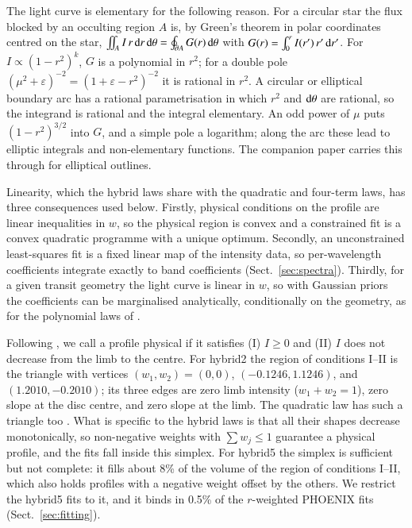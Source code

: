 \documentclass{aa}
\begin{document}
The light curve is elementary for the following reason. For a circular
star the flux blocked by an occulting region $A$ is, by Green's theorem in
polar coordinates centred on the star,
$\iint_A I\,r\,{\rm d}r\,{\rm d}\theta=\oint_{\partial A}G(r)\,{\rm d}\theta$
with $G(r)=\int_0^rI(r')\,r'\,{\rm d}r'$. For $I\propto(1-r^2)^k$, $G$ is a
polynomial in $r^2$; for a double pole $(\mu^2+\varepsilon)^{-2}=
(1+\varepsilon-r^2)^{-2}$ it is rational in $r^2$. A circular or elliptical
boundary arc has a rational parametrisation in which $r^2$ and ${\rm
d}\theta$ are rational, so the integrand is rational and the integral
elementary. An odd power of $\mu$ puts $(1-r^2)^{3/2}$ into $G$, and a simple
pole a logarithm; along the arc these lead to elliptic integrals and
non-elementary functions. The companion paper \citep{squishier} carries this
through for elliptical outlines.

Linearity, which the hybrid laws share with the quadratic and four-term
laws, has three consequences used below. Firstly, physical conditions on the
profile are linear inequalities in $w$, so the physical region is convex and a
constrained fit is a convex quadratic programme with a unique optimum.
Secondly, an unconstrained least-squares fit is a fixed linear map of the
intensity data, so per-wavelength coefficients integrate exactly to band
coefficients (Sect.~\ref{sec:spectra}). Thirdly, for a given transit geometry
the light curve is linear in $w$, so with Gaussian priors the coefficients can
be marginalised analytically, conditionally on the geometry, as for the
polynomial laws of \citet{agol2020}.

Following \citet{kipping2013}, we call a profile physical if it satisfies
(I) $I\ge0$ and (II) $I$ does not decrease from the limb to the centre. For
hybrid2 the region of conditions I--II is the triangle with vertices
$(w_1,w_2)=(0,0)$, $(-0.1246,1.1246)$, and $(1.2010,-0.2010)$; its three edges
are zero limb intensity ($w_1+w_2=1$), zero slope at the disc centre, and zero
slope at the limb. The quadratic law has such a triangle too
\citep{kipping2013}. What is specific to the hybrid laws is that all their
shapes decrease monotonically, so non-negative weights with $\sum w_j\le1$
guarantee a physical profile, and the fits fall inside this simplex. For
hybrid5 the simplex is sufficient but not complete: it fills about 8\% of the
volume of the region of conditions I--II, which also holds profiles with a
negative weight offset by the others. We restrict the hybrid5 fits to it, and
it binds in 0.5\% of the $r$-weighted PHOENIX fits (Sect.~\ref{sec:fitting}).
\end{document}
